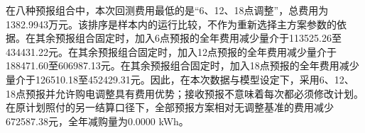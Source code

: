 在八种预报组合中，本次回测费用最低的是“6、12、18点调整”，总费用为1382.9943万元。该排序是样本内的运行比较，不作为重新选择主方案参数的依据。在其余预报组合固定时，加入6点预报的全年费用减少量介于113525.26至434431.22元。在其余预报组合固定时，加入12点预报的全年费用减少量介于188471.60至606987.13元。在其余预报组合固定时，加入18点预报的全年费用减少量介于126510.18至452429.31元。因此，在本次数据与模型设定下，采用6、12、18点预报并允许购电调整具有费用优势；接收预报不意味着每次都必须修改计划。在原计划照付的另一结算口径下，全部预报方案相对无调整基准的费用减少672587.38元，全年减购量为0.0000 kWh。